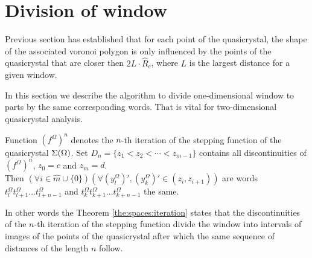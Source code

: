 \documentclass[text.tex]{subfiles}
\begin{document}
\section{Division of window}%
Previous section has established that for each point of the quasicrystal, the shape of the associated voronoi polygon is only influenced by the points of the quasicrystal that are closer then $2L\cdot\hat{R}_c$, where $L$ is the largest distance for a given window. 

In this section we describe the algorithm to divide one-dimensional window to parts by the same corresponding words. That is vital for two-dimensional quasicrystal analysis.

\begin{theorem}
\label{the:spaces:iteration}
Function ${(f^\Omega)}^n$ denotes the $n$-th iteration of the stepping function of the quasicrystal $\Sigma(\Omega)$. Set $D_n = \{z_1 < z_2 < \dotsb < z_{m-1}\}$ contains all discontinuities of ${(f^\Omega)}^n$, $z_0 = c$ and $z_m = d$.\\
Then $(\forall i \in \widehat{m}\cup\{0\})(\forall {\left(y_l^\Omega\right)}' ,{\left(y_k^\Omega\right)}' \in (z_i, z_{i+1}))$ are words $t_l^\Omega t_{l+1}^\Omega \dotso t_{l+n-1}^\Omega$ and $t_k^\Omega t_{k+1}^\Omega \dotso t_{k+n-1}^\Omega$ the same.
\end{theorem}

\begin{remark}
In other words the Theorem \ref{the:spaces:iteration} states that the discontinuities of the $n$-th iteration of the stepping function divide the window into intervals of images of the points of the quasicrystal after which the same sequence of distances of the length $n$ follow.
\end{remark}
\end{document}
